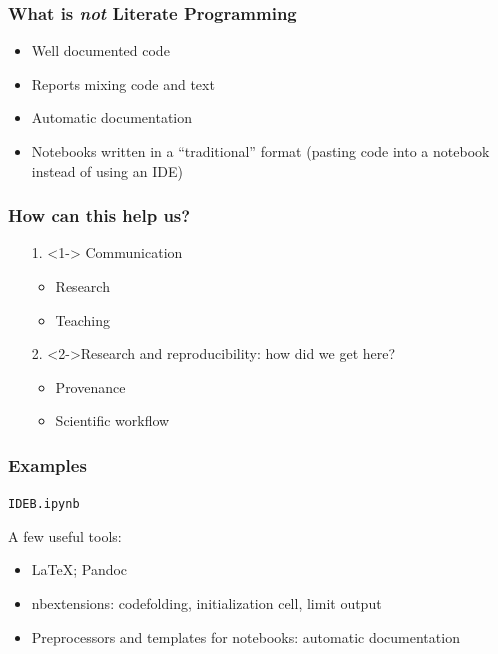 \documentclass[10pt]{beamer}
\begin{document}
\begin{frame}
  \frametitle{What is \emph{not} Literate Programming}
  \begin{itemize}
  \item Well documented code
  \item Reports mixing code and text 
  \item Automatic documentation
  \item Notebooks written in a ``traditional'' format (pasting code into a notebook instead of using an IDE)
  \end{itemize}
\end{frame}

\begin{frame}
  \frametitle{How can this help us?}

  \begin{itemize}
  \item[1.]<1-> Communication
    \begin{itemize}
    \item Research
    \item Teaching
    \end{itemize}
    
  \item[2.]<2->Research and reproducibility: how did we get here?
    \begin{itemize}
    \item Provenance
    \item Scientific workflow
    \end{itemize}
  \end{itemize}

\end{frame}


\begin{frame}[fragile]
  \frametitle{Examples}
     \begin{center}
      \begin{minipage}{0.7\textwidth}
      \begin{block}{}
         \begin{center}
              \verb+IDEB.ipynb+
         \end{center}
      \end{block}
    \end{minipage}
   \end{center}
   \vfill
   A few useful tools:
   \begin{itemize}
   \item \LaTeX; Pandoc
   \item nbextensions: codefolding, initialization cell, limit output
   \item Preprocessors and templates for notebooks: automatic documentation
   \end{itemize}

\end{frame}
\end{document}
